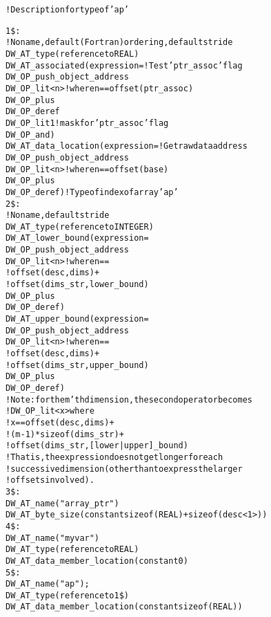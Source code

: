 \begin{alltt}
! Description for type of 'ap'

1\$: 
        ! No name, default (Fortran) ordering, default stride
        DW\-\_AT\-\_type(reference to REAL)
        DW\-\_AT\-\_associated(expression= ! Test 'ptr\_assoc' flag
            DW\-\_OP\-\_push\-\_object\-\_address
            DW\-\_OP\-\_lit<n> ! where n == offset(ptr\_assoc)
            DW\-\_OP\-\_plus
            DW\-\_OP\-\_deref
            DW\-\_OP\-\_lit1 ! mask for 'ptr\_assoc' flag
            DW\-\_OP\-\_and)
        DW\-\_AT\-\_data\-\_location(expression= ! Get raw data address
            DW\-\_OP\-\_push\-\_object\-\_address
            DW\-\_OP\-\_lit<n> ! where n == offset(base)
            DW\-\_OP\-\_plus
            DW\-\_OP\-\_deref) ! Type of index of array 'ap'
2\$:     
        ! No name, default stride
        DW\-\_AT\-\_type(reference to INTEGER)
        DW\-\_AT\-\_lower\-\_bound(expression=
        DW\-\_OP\-\_push\-\_object\-\_address
            DW\-\_OP\-\_lit<n> ! where n ==
                         !  offset(desc, dims) +
                         !  offset(dims\_str, lower\_bound)
            DW\-\_OP\-\_plus
            DW\-\_OP\-\_deref)
        DW\-\_AT\-\_upper\-\_bound(expression=
            DW\-\_OP\-\_push\-\_object\-\_address
            DW\-\_OP\-\_lit<n> ! where n ==
                         !  offset(desc, dims) +
                         !  offset(dims\_str, upper\_bound)
            DW\-\_OP\-\_plus
            DW\-\_OP\-\_deref)
        !  Note: for the m'th dimension, the second operator becomes
        !  DW\-\_OP\-\_lit<x> where
        !  x == offset(desc, dims) +
        !  (m-1)*sizeof(dims\_str) +
        !  offset(dims\_str, [lower|upper]\_bound)
        !  That is, the expression does not get longer for each
        !  successive dimension (other than to express the larger
        !  offsets involved).
3\$: 
        DW\-\_AT\-\_name("array\_ptr")
        DW\-\_AT\-\_byte\-\_size(constant sizeof(REAL) + sizeof(desc<1>))
4\$:     
            DW\-\_AT\-\_name("myvar")
            DW\-\_AT\-\_type(reference to REAL)
            DW\-\_AT\-\_data\-\_member\-\_location(constant 0)
5\$:     
            DW\-\_AT\-\_name("ap");
            DW\-\_AT\-\_type(reference to 1\$)
            DW\-\_AT\-\_data\-\_member\-\_location(constant sizeof(REAL))


\end{alltt}
